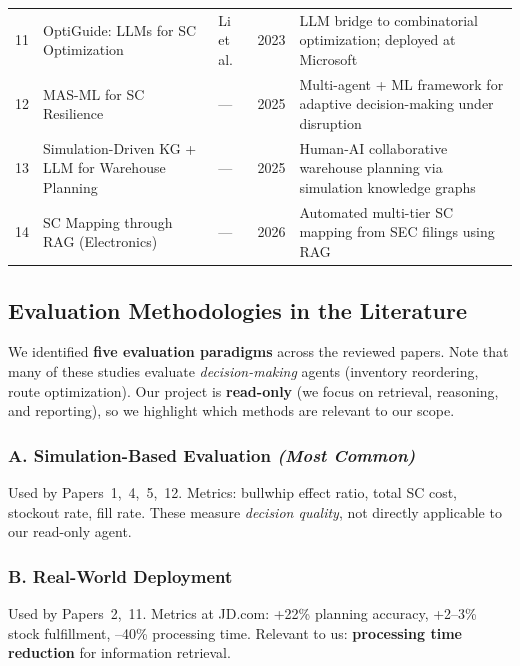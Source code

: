 \documentclass[11pt,a4paper]{article}
\begin{document}
\begin{longtable}{C{0.4cm} L{4.2cm} L{2.2cm} C{0.7cm} L{5.6cm}}
11 & OptiGuide: LLMs for SC Optimization &
    Li et al. & 2023 &
    LLM bridge to combinatorial optimization; deployed at Microsoft \\

12 & MAS-ML for SC Resilience &
    --- & 2025 &
    Multi-agent + ML framework for adaptive decision-making under disruption \\

13 & Simulation-Driven KG + LLM for Warehouse Planning &
    --- & 2025 &
    Human-AI collaborative warehouse planning via simulation knowledge graphs \\

14 & SC Mapping through RAG (Electronics) &
    --- & 2026 &
    Automated multi-tier SC mapping from SEC filings using RAG \\

\end{longtable}

\renewcommand{\arraystretch}{1.0}

\subsection{Evaluation Methodologies in the Literature}

We identified \textbf{five evaluation paradigms} across the reviewed papers. Note that many of these studies evaluate \textit{decision-making} agents (inventory reordering, route optimization). Our project is \textbf{read-only} (we focus on retrieval, reasoning, and reporting), so we highlight which methods are relevant to our scope.

\subsubsection{A. Simulation-Based Evaluation \textnormal{\textit{(Most Common)}}}

Used by Papers~1,~4,~5,~12. Metrics: bullwhip effect ratio, total SC cost, stockout rate, fill rate. These measure \textit{decision quality}, not directly applicable to our read-only agent.

\subsubsection{B. Real-World Deployment}

Used by Papers~2,~11. Metrics at JD.com: +22\% planning accuracy, +2--3\% stock fulfillment, --40\% processing time. Relevant to us: \textbf{processing time reduction} for information retrieval.
\end{document}
